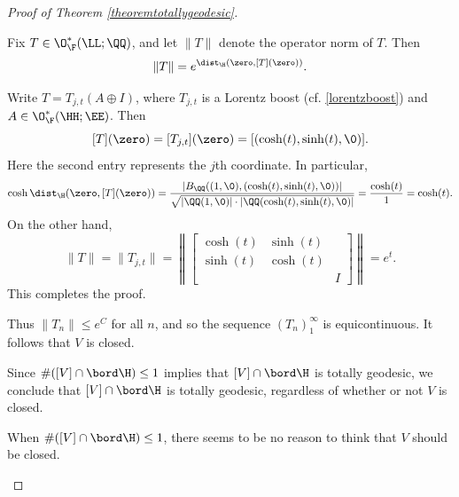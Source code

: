 \begin{proof}[Proof of Theorem \ref{theoremtotallygeodesic}]
\begin{subproof}
\begin{lemma}
\label{lemmaoperatornorm}
Fix $T\in\O_\F^*(\LL;\QQ)$, and let $\|T\|$ denote the operator norm of $T$. Then
\[
\|T\| = e^{\dist_\H(\zero,[T](\zero))}.
\]
\end{lemma}
\begin{subproof}
Write $T = T_{j,t}(A\oplus I)$, where $T_{j,t}$ is a Lorentz boost (cf. \eqref{lorentzboost}) and $A\in\O_\F^*(\HH;\EE)$. Then
\[
[T](\zero) = [T_{j,t}](\zero) = [(\cosh(t),\sinh(t),\0)].
\]
Here the second entry represents the $j$th coordinate. In particular,
\[
\cosh\dist_\H(\zero,[T](\zero)) = \frac{|B_\QQ((1,\0),(\cosh(t),\sinh(t),\0))|}{\sqrt{|\QQ(1,\0)|\cdot|\QQ(\cosh(t),\sinh(t),\0)|}} = \frac{\cosh(t)}{1} = \cosh(t).
\]
On the other hand,
\[
\|T\| = \|T_{j,t}\| = \left\|
\left[\begin{array}{ccc}
\cosh(t) & \sinh(t) & \\
\sinh(t) & \cosh(t) &\\
&& I
\end{array}\right] \right\| = e^t.
\]
This completes the proof.
\end{subproof}
\noindent Thus $\|T_n\| \leq e^C$ for all $n$, and so the sequence $(T_n)_1^\infty$ is equicontinuous. It follows that $V$ is closed.
\end{subproof}
\noindent Since $\#([V]\cap\bord\H)\leq 1$ implies that $[V]\cap\bord\H$ is totally geodesic, we conclude that $[V]\cap\bord\H$ is totally geodesic, regardless of whether or not $V$ is closed.

\begin{remark}
When $\#([V]\cap\bord\H)\leq 1$, there seems to be no reason to think that $V$ should be closed.
\end{remark}


\end{proof}

